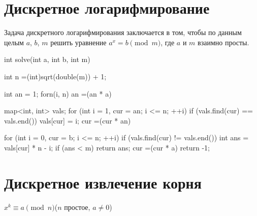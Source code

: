 \documentclass[12pt, titlepage]{article}
\begin{document}
\section{Дискретное логарифмирование}

Задача дискретного логарифмирования заключается в том, чтобы по данным целым $a$, $b$, $m$ решить уравнение $a^x = b\pmod{m}$, где $a$ и $m$ взаимно просты.

\begin{cppcode}
int solve(int a, int b, int m) {
    int n =(int)sqrt(double(m)) + 1;
 
    int an = 1;
    forn(i, n)
        an =(an * a) %
 
    map<int, int> vals;
    for (int i = 1, cur = an; i <= n; ++i) {
        if (vals.find(cur) == vals.end())
            vals[cur] = i;
        cur =(cur * an) %
    }
 
    for (int i = 0, cur = b; i <= n; ++i) {
        if (vals.find(cur) != vals.end()) {
            int ans = vals[cur] * n - i;
            if (ans < m)
                return ans;
        }
        cur =(cur * a) %
    }
    return -1;
}
\end{cppcode}

\section{Дискретное извлечение корня}
$x^k \equiv a\pmod{n}$($n$ простое, $a \neq 0$)
\end{document}
